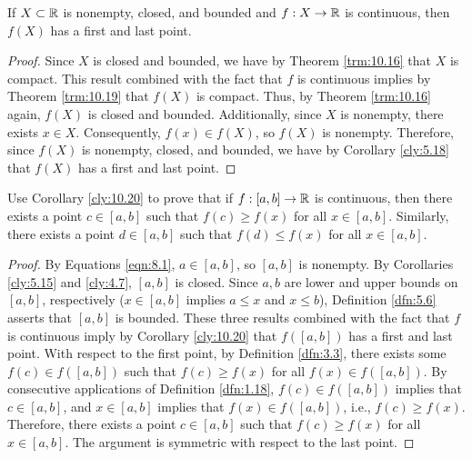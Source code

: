 \documentclass[../main.tex]{subfiles}
\begin{document}
\begin{corollary}\label{cly:10.20}
    If $X\subset\mathbb{R}$ is nonempty, closed, and bounded and $f:X\to\mathbb{R}$ is continuous, then $f(X)$ has a first and last point.
    \begin{proof}
        Since $X$ is closed and bounded, we have by Theorem \ref{trm:10.16} that $X$ is compact. This result combined with the fact that $f$ is continuous implies by Theorem \ref{trm:10.19} that $f(X)$ is compact. Thus, by Theorem \ref{trm:10.16} again, $f(X)$ is closed and bounded. Additionally, since $X$ is nonempty, there exists $x\in X$. Consequently, $f(x)\in f(X)$, so $f(X)$ is nonempty. Therefore, since $f(X)$ is nonempty, closed, and bounded, we have by Corollary \ref{cly:5.18} that $f(X)$ has a first and last point.
    \end{proof}
\end{corollary}

\begin{exercise}\label{exr:10.21}
    Use Corollary \ref{cly:10.20} to prove that if $f:[a,b]\to\mathbb{R}$ is continuous, then there exists a point $c\in[a,b]$ such that $f(c)\geq f(x)$ for all $x\in[a,b]$. Similarly, there exists a point $d\in[a,b]$ such that $f(d)\leq f(x)$ for all $x\in[a,b]$.
    \begin{proof}
        By Equations \ref{eqn:8.1}, $a\in[a,b]$, so $[a,b]$ is nonempty. By Corollaries \ref{cly:5.15} and \ref{cly:4.7}, $[a,b]$ is closed. Since $a,b$ are lower and upper bounds on $[a,b]$, respectively ($x\in[a,b]$ implies $a\leq x$ and $x\leq b$), Definition \ref{dfn:5.6} asserts that $[a,b]$ is bounded. These three results combined with the fact that $f$ is continuous imply by Corollary \ref{cly:10.20} that $f([a,b])$ has a first and last point. With respect to the first point, by Definition \ref{dfn:3.3}, there exists some $f(c)\in f([a,b])$ such that $f(c)\geq f(x)$ for all $f(x)\in f([a,b])$. By consecutive applications of Definition \ref{dfn:1.18}, $f(c)\in f([a,b])$ implies that $c\in[a,b]$, and $x\in[a,b]$ implies that $f(x)\in f([a,b])$, i.e., $f(c)\geq f(x)$. Therefore, there exists a point $c\in[a,b]$ such that $f(c)\geq f(x)$ for all $x\in[a,b]$. The argument is symmetric with respect to the last point.
    \end{proof}
\end{exercise}
\end{document}

